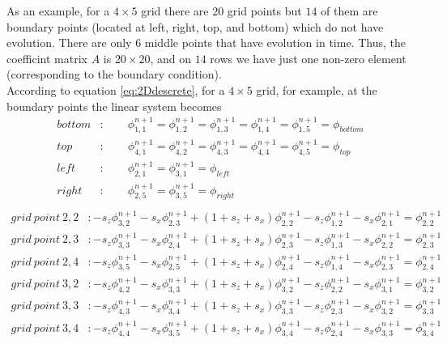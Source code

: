 As an example, for a $4 \times 5$ grid there are $20$ grid points but $14$ of them are boundary points (located at left, right, top, and bottom) which do not have evolution. There are only $6$ middle points that have evolution in time. Thus, the coefficint matrix $A$ is $20 \times 20$, and on $14$ rows we have just one non-zero element (corresponding to the boundary condition).
\\
According to equation \ref{eq:2Ddescrete}, for a $4 \times 5$ grid, for example, at the boundary points the linear system becomes
\begin{align}
bottom &: \qquad \phi^{n+1}_{1,1}= \phi^{n+1}_{1,2}=\phi^{n+1}_{1,3}=\phi^{n+1}_{1,4}=\phi^{n+1}_{1,5}=\phi_{bottom} \\
top &: \qquad \phi^{n+1}_{4,1}=\phi^{n+1}_{4,2}=\phi^{n+1}_{4,3}=\phi^{n+1}_{4,4}=\phi^{n+1}_{4,5} = \phi_{top} \\
left &: \qquad \phi^{n+1}_{2,1}=\phi^{n+1}_{3,1}=\phi_{left} \\
right &: \qquad \phi^{n+1}_{2,5}=\phi^{n+1}_{3,5}= \phi_{right} \\
\label{eq:2D45boundary}
\end{align}
\begin{align}
grid \ point \ 2,2 &:-s_z \phi^{n+1}_{3,2} -s_x \phi^{n+1}_{2,3} +(1+s_z+s_x) \phi^{n+1}_{2,2} -s_z \phi^{n+1}_{1,2} -s_x \phi^{n+1}_{2,1}  = \phi^{n+1}_{2,2} \\
grid \ point \ 2,3 &:-s_z \phi^{n+1}_{3,3} -s_x \phi^{n+1}_{2,4} +(1+s_z+s_x) \phi^{n+1}_{2,3} -s_z \phi^{n+1}_{1,3} -s_x \phi^{n+1}_{2,2}  = \phi^{n+1}_{2,3} \\
grid \ point \  2,4 &:-s_z \phi^{n+1}_{3,5} -s_x \phi^{n+1}_{2,5} +(1+s_z+s_x) \phi^{n+1}_{2,4} -s_z \phi^{n+1}_{1,4} -s_x \phi^{n+1}_{2,3}  = \phi^{n+1}_{2,4} \\
grid \ point \ 3,2 &:-s_z \phi^{n+1}_{4,2} -s_x \phi^{n+1}_{3,3} +(1+s_z+s_x) \phi^{n+1}_{3,2} -s_z \phi^{n+1}_{2,2} -s_x \phi^{n+1}_{3,1}  = \phi^{n+1}_{3,2} \\
grid \ point \ 3,3 &:-s_z \phi^{n+1}_{4,3} -s_x \phi^{n+1}_{3,4} +(1+s_z+s_x) \phi^{n+1}_{3,3} -s_z \phi^{n+1}_{2,3} -s_x \phi^{n+1}_{3,2}  = \phi^{n+1}_{3,3} \\
grid \ point \ 3,4 &:-s_z \phi^{n+1}_{4,4} -s_x \phi^{n+1}_{3,5} +(1+s_z+s_x) \phi^{n+1}_{3,4} -s_z \phi^{n+1}_{2,4} -s_x \phi^{n+1}_{3,3}  = \phi^{n+1}_{3,4} \\
\label{eq:2D45middle}
\end{align}


